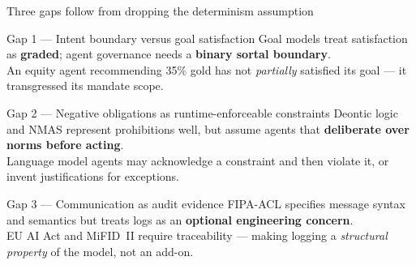 \documentclass[aspectratio=169,10pt]{beamer}
\newcommand{\key}[1]{\textcolor{aiAccent}{\textbf{#1}}}
\begin{document}
\begin{frame}{Three gaps follow from dropping the determinism assumption}
  \begin{block}{Gap 1 --- Intent boundary versus goal satisfaction}
    Goal models treat satisfaction as \key{graded}; agent governance needs a
    \key{binary sortal boundary}.\\[0.15em]
    {\small\color{aiGray} An equity agent recommending 35\% gold has not
     \emph{partially} satisfied its goal --- it transgressed its mandate scope.}
  \end{block}
  \begin{block}{Gap 2 --- Negative obligations as runtime-enforceable constraints}
    Deontic logic and NMAS represent prohibitions well, but assume agents that
    \key{deliberate over norms before acting}.\\[0.15em]
    {\small\color{aiGray} Language model agents may acknowledge a constraint and
     then violate it, or invent justifications for exceptions.}
  \end{block}
  \begin{block}{Gap 3 --- Communication as audit evidence}
    FIPA-ACL specifies message syntax and semantics but treats logs as an
    \key{optional engineering concern}.\\[0.15em]
    {\small\color{aiGray} EU AI Act and MiFID~II require traceability --- making
     logging a \emph{structural property} of the model, not an add-on.}
  \end{block}
\end{frame}
\end{document}
